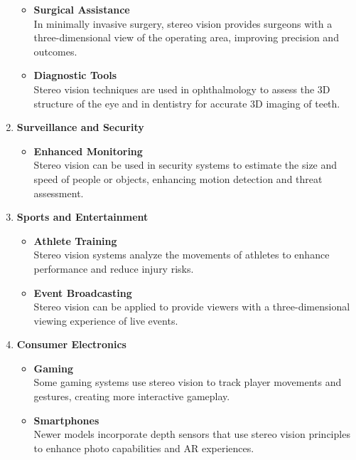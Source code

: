 \documentclass[22pt]{report}
\begin{document}
\begin{enumerate}
\begin{itemize}
                    \item \textbf{Surgical Assistance}\\
                        In minimally invasive surgery, stereo vision provides surgeons with a three-dimensional view of the operating area, improving precision and outcomes.
                    \item \textbf{Diagnostic Tools}\\
                        Stereo vision techniques are used in ophthalmology to assess the 3D structure of the eye and in dentistry for accurate 3D imaging of teeth.
                 \end{itemize}
            \item \textbf{Surveillance and Security}
                \begin{itemize}
                    \item \textbf{Enhanced Monitoring}\\
                        Stereo vision can be used in security systems to estimate the size and speed of people or objects, enhancing motion detection and threat assessment.
                \end{itemize}
            \item \textbf{Sports and Entertainment}
                \begin{itemize}
                    \item \textbf{Athlete Training}\\
                        Stereo vision systems analyze the movements of athletes to enhance performance and reduce injury risks.
                    \item \textbf{Event Broadcasting} \\
                        Stereo vision can be applied to provide viewers with a three-dimensional viewing experience of live events.
                \end{itemize}
            \item \textbf{Consumer Electronics}
                \begin{itemize}
                    \item \textbf{Gaming}\\
                        Some gaming systems use stereo vision to track player movements and gestures, creating more interactive gameplay.
                    \item \textbf{Smartphones} \\
                        Newer models incorporate depth sensors that use stereo vision principles to enhance photo capabilities and AR experiences.
                \end{itemize}
        \end{enumerate}
\end{document}
